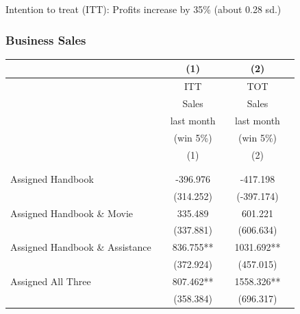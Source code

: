 \documentclass[hideothersubsections, usenames,dvipsnames,11pt]{beamer}
\newenvironment{itemize_2pt}{\itemize\addtolength{\itemsep}{2pt}}{\enditemize}
\begin{document}
\begin{frame}
{{\begin{table}[t]
\end{table}}}

\vspace{-0.5em}

\begin{itemize_2pt}
\item Intention to treat (ITT): Profits increase by 35\% (about 0.28 sd.)
\end{itemize_2pt}
\end{frame}




\begin{frame}
\frametitle{Business Sales}
{\scriptsize{\begin{table}[t]
\centering
\fontsize{5.7}{5.7}\selectfont
	\tabcolsep=0.10cm
	\begin{tabular}{l*{5}{c}}
\hline
&& (1) && (2) \\
\hline
                &&\textcolor{bdf}{ITT}	        &&\textcolor{bdf}{TOT} \\
			   &&\textcolor{bdf}{Sales}	        &&\textcolor{bdf}{Sales} \\
				&&\textcolor{bdf}{last month}  		&&\textcolor{bdf}{last month} \\
			&&(win 5\%)			&&(win 5\%) \\
				&&(1)				&&(2)	\\
&& \\
					\hline
&&\\
		

Assigned Handbook 					&&-396.976   	&&               -417.198		\\
       								 	&&        (314.252)   	&&          (-397.174)	\\

         							
Assigned Handbook \& Movie				&&335.489   	  	&& 601.221    		\\
       									&&       (337.881)  	&&            (606.634)	\\

         							
Assigned Handbook \& Assistance 	&&                   836.755**	&&                     1031.692** 	\\
       								 	&&        (372.924) 	&&            (457.015) 	\\
         							
Assigned All Three         		&&         807.462**  	&&                         1558.326**		\\
       								 	&&        (358.384)  	&&          (696.317)   	\\


\end{tabular}
\end{table}}}
\end{frame}
\end{document}
